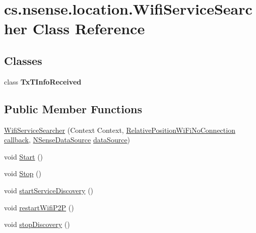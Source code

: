 \hypertarget{classcs_1_1nsense_1_1location_1_1_wifi_service_searcher}{\section{cs.\-nsense.\-location.\-Wifi\-Service\-Searcher Class Reference}
\label{classcs_1_1nsense_1_1location_1_1_wifi_service_searcher}
}
\subsection*{Classes}
\begin{DoxyCompactItemize}
\item 
class {\bfseries Tx\-T\-Info\-Received}
\end{DoxyCompactItemize}
\subsection*{Public Member Functions}
\begin{DoxyCompactItemize}
\item 
\hyperlink{classcs_1_1nsense_1_1location_1_1_wifi_service_searcher_a02fc3ab25e48fed8560c222d84847d19}{Wifi\-Service\-Searcher} (Context Context, \hyperlink{classcs_1_1nsense_1_1location_1_1_relative_position_wi_fi_no_connection}{Relative\-Position\-Wi\-Fi\-No\-Connection} \hyperlink{classcs_1_1nsense_1_1location_1_1_wifi_service_searcher_aad31a938d8f3998424053d7da9ae0f60}{callback}, \hyperlink{classcs_1_1nsense_1_1db_1_1_n_sense_data_source}{N\-Sense\-Data\-Source} \hyperlink{classcs_1_1nsense_1_1location_1_1_wifi_service_searcher_aac635f7d18b5e3d913052ef023030f16}{data\-Source})
\item 
void \hyperlink{classcs_1_1nsense_1_1location_1_1_wifi_service_searcher_a9f23bd2acba295715ce48bb83019f0e4}{Start} ()
\item 
void \hyperlink{classcs_1_1nsense_1_1location_1_1_wifi_service_searcher_ada8315e2b15cf668d7b82508a608a437}{Stop} ()
\item 
void \hyperlink{classcs_1_1nsense_1_1location_1_1_wifi_service_searcher_acbba42ffb9d28def7f135003374c785d}{start\-Service\-Discovery} ()
\item 
void \hyperlink{classcs_1_1nsense_1_1location_1_1_wifi_service_searcher_a4a0181b9d0a4ef32ba3a1b77cd479812}{restart\-Wifi\-P2\-P} ()
\item 
void \hyperlink{classcs_1_1nsense_1_1location_1_1_wifi_service_searcher_a9f0fd191b41f9408a408fe274678d05e}{stop\-Discovery} ()
\end{DoxyCompactItemize}
